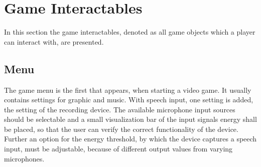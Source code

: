 
\section{Game Interactables}
\thesisStateNotReady
In this section the game interactables, denoted as all game objects which a player can interact with, are presented.

\subsection{Menu}
The game menu is the first that appears, when starting a video game. 
It usually contains settings for graphic and music.
With speech input, one setting is added, the setting of the recording device.
The available microphone input sources should be selectable and a small visualization bar of the input signals energy shall be placed, so that the user can verify the correct functionality of the device.
Further an option for the energy threshold, by which the device captures a speech input, must be adjustable, because of different output values from varying microphones.
